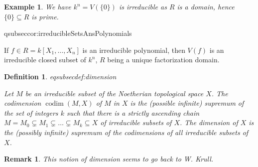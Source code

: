 \documentclass[DIV=14,parskip=full,pointednumbers]{scrartcl}
\theoremstyle{cthm}
\theoremstyle{cvarthm}
\theoremstyle{cdef}
\newtheorem{defi}{Definition}[subsection]
\newtheorem{example}{Example}[subsection]
\newtheorem*{rem*}{Remark}
\newcommand{\lbl}[1]{
	\label{#1}
	\ifmmode
	\expandafter\xdef\csname eqsubsec#1\endcsname{\thesubsection}
	\fi
}
\newcommand{\codim}{\operatorname{codim}}
\begin{document}
	\begin{example}
		We have $k^n = V(\{0\})$ is irreducible as $R$ is a domain, hence $\{0\}\subseteq R$ is prime.
	\end{example}
	\begin{cor}\lbl{cor:irreducibleSetsAnsPolynomials}
		If $f\in R = k[X_1,\ldots, X_n]$ is an irreducible polynomial, then $V(f)$ is an irreducible closed subset of $k^n$, $R$ being a unique factorization domain.
	\end{cor}
	\begin{defi}\lbl{def:dimension}
		Let $M$ be an irreducible subset of the Noetherian topological space $X$. The \emph{codimension} $\codim(M,X)$ of $M$ in $X$ is the (possible infinite) supremum of the set of integers $k$ such that there is a strictly ascending chain $M=M_0\subsetneq M_1\subsetneq \ldots \subsetneq M_k\subseteq X$ of irreducible subsets of $X$. The \emph{dimension} of $X$ is the (possibly infinite) supremum of the codimensions of all irreducible subsets of $X$.
	\end{defi}
	\begin{rem*}
		This notion of dimension seems to go back to W. Krull.
	\end{rem*}
	\setcounter{temp}{\theequation}
	\setcounter{equation}{0}
\end{document}
